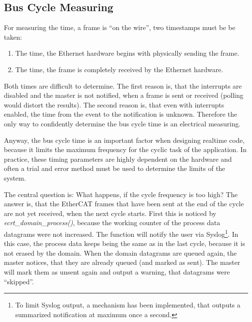 \documentclass[a4paper,12pt,BCOR6mm,bibtotoc,idxtotoc]{scrbook}
\begin{document}

\subsection{Bus Cycle Measuring}
\label{sec:timing-bus}

For measuring the time, a frame is ``on the wire'', two timestamps
must be be taken:

\begin{enumerate}
\item The time, the Ethernet hardware begins with physically sending
  the frame.
\item The time, the frame is completely received by the Ethernet
  hardware.
\end{enumerate}

Both times are difficult to determine. The first reason is, that the
interrupts are disabled and the master is not notified, when a frame
is sent or received (polling would distort the results). The second
reason is, that even with interrupts enabled, the time from the event
to the notification is unknown. Therefore the only way to confidently
determine the bus cycle time is an electrical measuring.

Anyway, the bus cycle time is an important factor when designing realtime
code, because it limits the maximum frequency for the cyclic task of the
application.  In practice, these timing parameters are highly dependent on the
hardware and often a trial and error method must be used to determine the
limits of the system.

The central question is: What happens, if the cycle frequency is too high? The
answer is, that the EtherCAT frames that have been sent at the end of the cycle
are not yet received, when the next cycle starts.  First this is noticed by
\textit{ecrt\_domain\_process()}, because the working counter of the process
data datagrams were not increased. The function will notify the user via
Syslog\footnote{To limit Syslog output, a mechanism has been implemented, that
outputs a summarized notification at maximum once a second.}. In this case, the
process data keeps being the same as in the last cycle, because it is not
erased by the domain. When the domain datagrams are queued again, the master
notices, that they are already queued (and marked as sent). The master will
mark them as unsent again and output a warning, that datagrams were
``skipped''.
\end{document}
